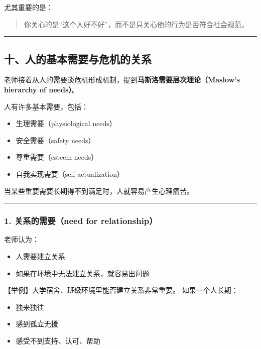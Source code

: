 \documentclass[
  chinese,
  9pt,
  a4paper,
]{ctexart}
\providecommand{\tightlist}{%
  \setlength{\itemsep}{0pt}\setlength{\parskip}{0pt}}
\begin{document}
尤其重要的是：

\begin{quote}
你关心的是``这个人好不好''，而不是只关心他的行为是否符合社会规范。
\end{quote}

\begin{center}\rule{0.5\linewidth}{0.5pt}\end{center}

\subsection{十、人的基本需要与危机的关系}\label{ux5341ux4ebaux7684ux57faux672cux9700ux8981ux4e0eux5371ux673aux7684ux5173ux7cfb}

老师接着从人的需要谈危机形成机制，提到\textbf{马斯洛需要层次理论（Maslow's
hierarchy of needs）}。

人有许多基本需要，包括：

\begin{itemize}
\tightlist
\item
  生理需要（physiological needs）
\item
  安全需要（safety needs）
\item
  尊重需要（esteem needs）
\item
  自我实现需要（self-actualization）
\end{itemize}

当某些重要需要长期得不到满足时，人就容易产生心理痛苦。

\begin{center}\rule{0.5\linewidth}{0.5pt}\end{center}

\subsubsection{1. 关系的需要（need for
relationship）}\label{ux5173ux7cfbux7684ux9700ux8981need-for-relationship}

老师认为：

\begin{itemize}
\tightlist
\item
  人需要建立关系
\item
  如果在环境中无法建立关系，就容易出问题
\end{itemize}

【举例】大学宿舍、班级环境里能否建立关系非常重要。 如果一个人长期：

\begin{itemize}
\tightlist
\item
  独来独往
\item
  感到孤立无援
\item
  感受不到支持、认可、帮助
\end{itemize}
\end{document}
